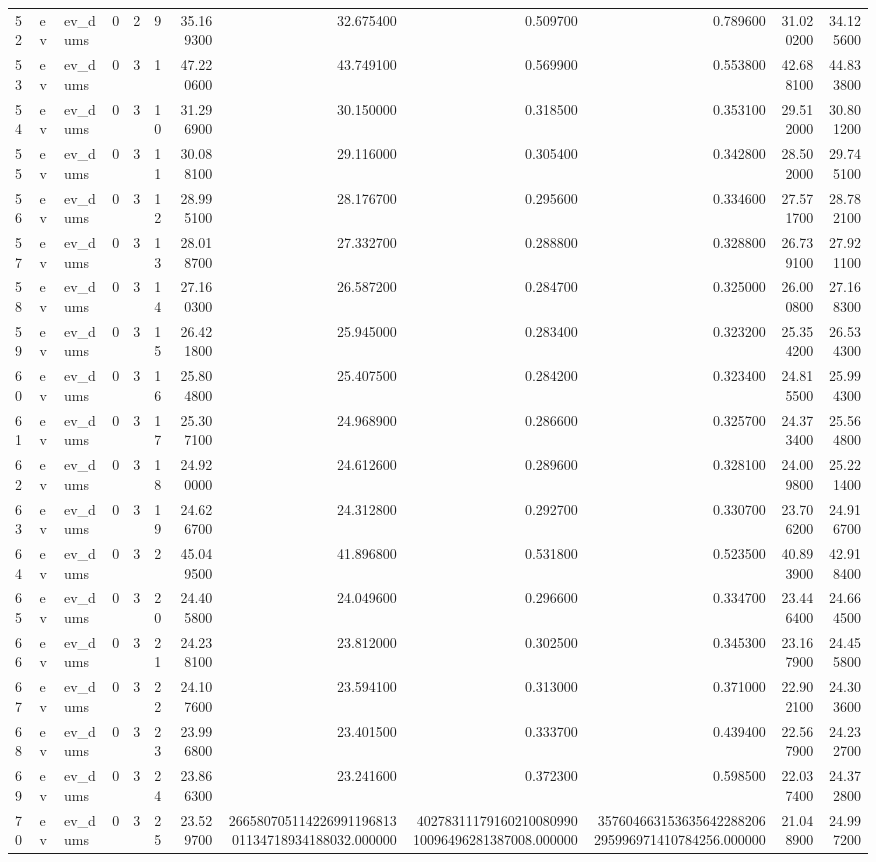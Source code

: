 \begin{tabular}{llllllrrrrrr}
52 & ev & ev_dums & 0 & 2 & 9 & 35.169300 & 32.675400 & 0.509700 & 0.789600 & 31.020200 & 34.125600 \\
53 & ev & ev_dums & 0 & 3 & 1 & 47.220600 & 43.749100 & 0.569900 & 0.553800 & 42.688100 & 44.833800 \\
54 & ev & ev_dums & 0 & 3 & 10 & 31.296900 & 30.150000 & 0.318500 & 0.353100 & 29.512000 & 30.801200 \\
55 & ev & ev_dums & 0 & 3 & 11 & 30.088100 & 29.116000 & 0.305400 & 0.342800 & 28.502000 & 29.745100 \\
56 & ev & ev_dums & 0 & 3 & 12 & 28.995100 & 28.176700 & 0.295600 & 0.334600 & 27.571700 & 28.782100 \\
57 & ev & ev_dums & 0 & 3 & 13 & 28.018700 & 27.332700 & 0.288800 & 0.328800 & 26.739100 & 27.921100 \\
58 & ev & ev_dums & 0 & 3 & 14 & 27.160300 & 26.587200 & 0.284700 & 0.325000 & 26.000800 & 27.168300 \\
59 & ev & ev_dums & 0 & 3 & 15 & 26.421800 & 25.945000 & 0.283400 & 0.323200 & 25.354200 & 26.534300 \\
60 & ev & ev_dums & 0 & 3 & 16 & 25.804800 & 25.407500 & 0.284200 & 0.323400 & 24.815500 & 25.994300 \\
61 & ev & ev_dums & 0 & 3 & 17 & 25.307100 & 24.968900 & 0.286600 & 0.325700 & 24.373400 & 25.564800 \\
62 & ev & ev_dums & 0 & 3 & 18 & 24.920000 & 24.612600 & 0.289600 & 0.328100 & 24.009800 & 25.221400 \\
63 & ev & ev_dums & 0 & 3 & 19 & 24.626700 & 24.312800 & 0.292700 & 0.330700 & 23.706200 & 24.916700 \\
64 & ev & ev_dums & 0 & 3 & 2 & 45.049500 & 41.896800 & 0.531800 & 0.523500 & 40.893900 & 42.918400 \\
65 & ev & ev_dums & 0 & 3 & 20 & 24.405800 & 24.049600 & 0.296600 & 0.334700 & 23.446400 & 24.664500 \\
66 & ev & ev_dums & 0 & 3 & 21 & 24.238100 & 23.812000 & 0.302500 & 0.345300 & 23.167900 & 24.455800 \\
67 & ev & ev_dums & 0 & 3 & 22 & 24.107600 & 23.594100 & 0.313000 & 0.371000 & 22.902100 & 24.303600 \\
68 & ev & ev_dums & 0 & 3 & 23 & 23.996800 & 23.401500 & 0.333700 & 0.439400 & 22.567900 & 24.232700 \\
69 & ev & ev_dums & 0 & 3 & 24 & 23.866300 & 23.241600 & 0.372300 & 0.598500 & 22.037400 & 24.372800 \\
70 & ev & ev_dums & 0 & 3 & 25 & 23.529700 & 26658070511422699119681301134718934188032.000000 & 4027831117916021008099010096496281387008.000000 & 357604663153635642288206295996971410784256.000000 & 21.048900 & 24.997200 \\

\end{tabular}
